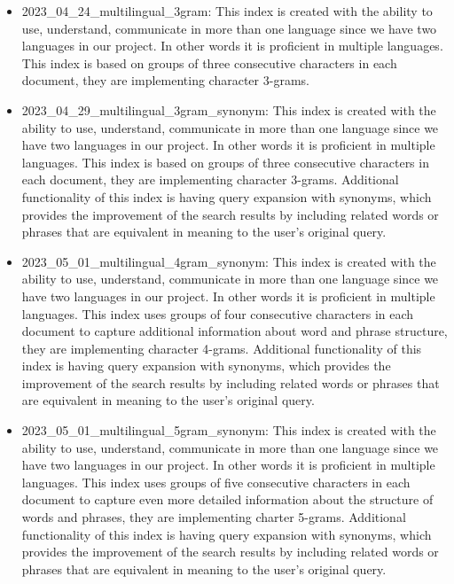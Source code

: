 \begin{itemize}
	\item 2023\_04\_24\_multilingual\_3gram: This index is created with the ability to use, understand, communicate in more than one language since we have two languages in our project. In other words it is proficient in multiple languages. This index is based on groups of three consecutive characters in each document, they are implementing character 3-grams.
	\item 2023\_04\_29\_multilingual\_3gram\_synonym: This index is created with the ability to use, understand, communicate in more than one language since we have two languages in our project. In other words it is proficient in multiple languages.  This index is based on groups of three consecutive characters in each document, they are implementing character 3-grams. Additional functionality of this index is having query expansion with synonyms, which provides the improvement of the search results by including related words or phrases that are equivalent in meaning to the user's original query.
	\item 2023\_05\_01\_multilingual\_4gram\_synonym: This index is created with the ability to use, understand, communicate in more than one language since we have two languages in our project. In other words it is proficient in multiple languages. This index uses groups of four consecutive characters in each document to capture additional information about word and phrase structure, they are implementing character 4-grams. Additional functionality of this index is having query expansion with synonyms, which provides the improvement of the search results by including related words or phrases that are equivalent in meaning to the user's original query.
	\item 2023\_05\_01\_multilingual\_5gram\_synonym: This index is created with the ability to use, understand, communicate in more than one language since we have two languages in our project. In other words it is proficient in multiple languages. This index uses groups of five consecutive characters in each document to capture even more detailed information about the structure of words and phrases, they are implementing charter 5-grams.  Additional functionality of this index is having query expansion with synonyms, which provides the improvement of the search results by including related words or phrases that are equivalent in meaning to the user's original query.

\end{itemize}
